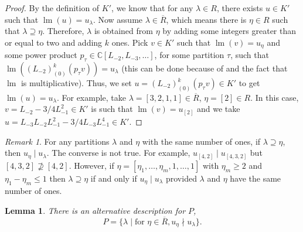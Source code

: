 \documentclass[a4paper, 12pt, reqno]{amsart}
\newtheorem{lemma}[theorem]{Lemma}
\theoremstyle{remark}
\newtheorem{remark}[theorem]{Remark}
\DeclareMathOperator{\lm}{lm}
\begin{document}
\begin{proof}
  By the definition of $K'$, we know that for any $\lambda \in R$, there exists $u \in K'$ such that $\lm(u) = u_{\lambda}$.
  Now assume $\lambda \in \overline{R}$, which means there is $\eta \in R$ such that $\lambda \supseteq \eta$.
  Therefore, $\lambda$ is obtained from $\eta$ by adding some integers greater than or equal to two and adding $k$ ones.
  Pick $v \in K'$ such that $\lm(v) = u_{\eta}$ and some power product $p_{\tau} \in \mathbb{C}[L_{-2}, L_{-3}, \dots]$, for some partition $\tau$, such that $\lm((L_{-2})^k_{(0)}(p_{\tau}v)) = u_{\lambda}$ (this can be done because of  and the fact that $\lm$ is multiplicative).
  Thus, we set $u = (L_{-2})^k_{(0)}(p_{\tau}v) \in K'$ to get $\lm(u) = u_{\lambda}$.
  For example, take $\lambda = [3, 2, 1, 1] \in \overline{R}$, $\eta = [2] \in R$.
  In this case, $v = L_{-2}- 3/4L_{-1}^2 \in K'$ is such that $\lm(v) = u_{[2]}$ and we take $u = L_{-3}L_{-2}L_{-1}^2 - 3/4L_{-3}L_{-1}^4 \in K'$.
\end{proof}

\begin{remark}
  \label{rmk:6}
  For any partitions $\lambda$ and $\eta$ with the same number of ones, if $\lambda \supseteq \eta$, then $u_{\eta} \mid u_{\lambda}$.
  The converse is not true.
  For example, $u_{[4, 2]} \mid u_{[4, 3, 2]}$ but $[4, 3, 2] \nsupseteq [4, 2]$.
  However, if $\eta = [\eta_1, \dots, \eta_m, 1, \dots, 1]$ with $\eta_m \ge 2$ and $\eta_1 - \eta_m \le 1$ then $\lambda \supseteq \eta$ if and only if $u_{\eta} \mid u_{\lambda}$ provided $\lambda$ and $\eta$ have the same number of ones.
\end{remark}

\begin{lemma}
  \label{lmm:11}
  There is an alternative description for $P$,
  \begin{equation*}
    P = \{\lambda \mid \text{for }\eta \in \overline{R}, u_{\eta} \nmid u_{\lambda}\}.
  \end{equation*}
\end{lemma}
\end{document}
